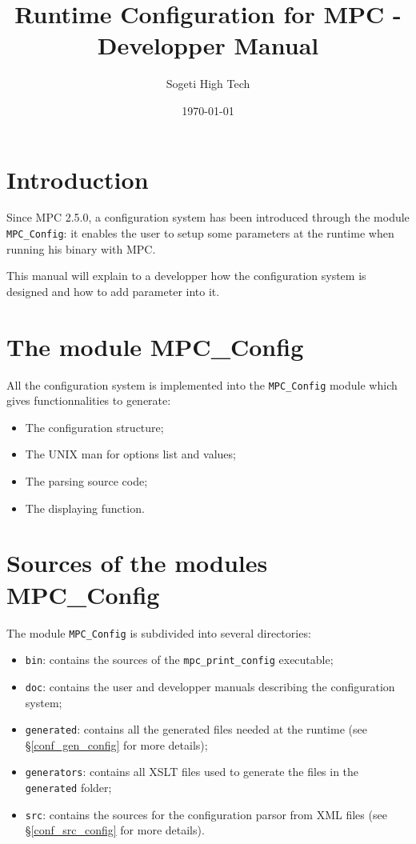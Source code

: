 \documentclass{article}
\author{Sogeti High Tech}
\title{Runtime Configuration for MPC - Developper Manual}
\date{\today}
\begin{document}
\hypersetup{pageanchor=false,citecolor=blue}
\maketitle

\newpage
{}
\tableofcontents
\newpage
{}
\hypersetup{pageanchor=true,citecolor=blue}

\section{Introduction}

Since MPC 2.5.0, a configuration system has been introduced through the module \texttt{MPC\_Config}: it enables the user to setup some parameters at the runtime when running his binary with MPC.
\newline

\noindent This manual will explain to a developper how the configuration system is designed and how to add parameter into it.

\section{The module MPC\_Config}

All the configuration system is implemented into the \texttt{MPC\_Config} module which gives functionnalities to generate:
\begin{itemize}
\item The configuration structure;
\item The UNIX man for options list and values;
\item The parsing source code;
\item The displaying function.
\end{itemize}

\section{Sources of the modules MPC\_Config}

The module \texttt{MPC\_Config} is subdivided into several directories:
\begin{itemize}
\item \texttt{bin}: contains the sources of the \texttt{mpc\_print\_config} executable;
\item \texttt{doc}: contains the user and developper manuals describing the configuration system;
\item \texttt{generated}: contains all the generated files needed at the runtime (see §\ref{conf_gen_config} for more details);
\item \texttt{generators}: contains all XSLT files used to generate the files in the \texttt{generated} folder;
\item \texttt{src}: contains the sources for the configuration parsor from XML files (see §\ref{conf_src_config} for more details).
\end{itemize}
\end{document}
